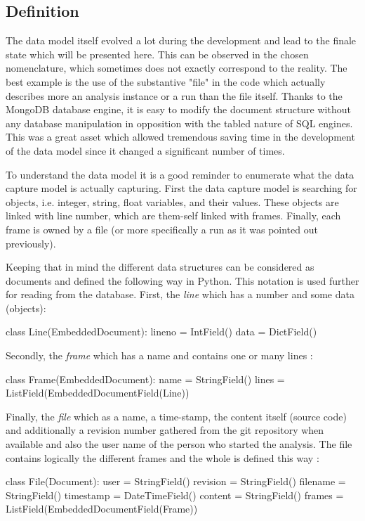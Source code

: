 \subsection{Definition}
The data model itself evolved a lot during the development and lead to the finale state which will be presented here. This can be observed in the chosen nomenclature, which sometimes does not exactly correspond to the reality. The best example is the use of the substantive "file" in the code which actually describes more an analysis instance or a run than the file itself. Thanks to the MongoDB database engine, it is easy to modify the document structure without any database manipulation in opposition with the tabled nature of SQL engines. This was a great asset which allowed tremendous saving time in the development of the data model since it changed a significant number of times.

To understand the data model it is a good reminder to enumerate what the data capture model is actually capturing. First the data capture model is searching for objects, i.e. integer, string, float variables, and their values. These objects are linked with line number, which are them-self linked with frames. Finally, each frame is owned by a file (or more specifically a run as it was pointed out previously).

Keeping that in mind the different data structures can be considered as documents and defined the following way in Python. This notation is used further for reading from the database. First, the \textit{line} which has a number and some data (objects):
\begin{python}
class Line(EmbeddedDocument):
    lineno = IntField()
    data = DictField()
\end{python}

Secondly, the \textit{frame} which has a name and contains one or many lines :

\begin{python}
class Frame(EmbeddedDocument):
    name = StringField()
    lines = ListField(EmbeddedDocumentField(Line))
\end{python}

Finally, the \textit{file} which as a name, a time-stamp, the content itself (source code) and additionally a revision number gathered from the git repository when available and also the user name of the person who started the analysis. The file contains logically the different frames and the whole is defined this way :
\begin{python}
class File(Document):
    user = StringField()
    revision = StringField()
    filename = StringField()
    timestamp = DateTimeField()
    content = StringField()
    frames = ListField(EmbeddedDocumentField(Frame))
\end{python}

